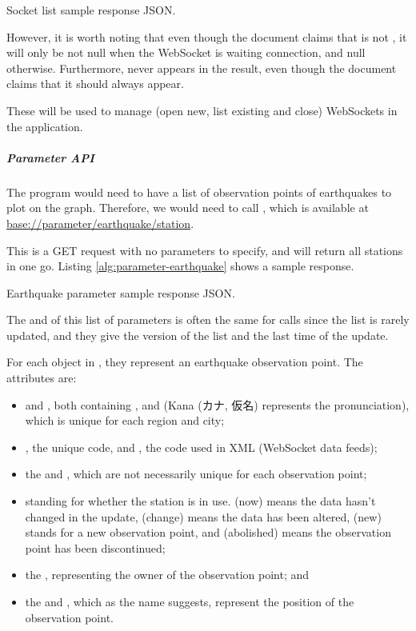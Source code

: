 \begin{listing}[!ht]
    \caption{Socket list sample response JSON.}
    \label{alg:socket-list}
\end{listing}

However, it is worth noting that even though the document claims that  is not , it will only be not null when the WebSocket is waiting connection, and null otherwise. Furthermore,  never appears in the result, even though the document claims that it should always appear.

These will be used to manage (open new, list existing and close) WebSockets in the application.

\subparagraph{Parameter API}

The program would need to have a list of observation points of earthquakes to plot on the graph. Therefore, we would need to call , which is available at \url{base://parameter/earthquake/station}.

This is a GET request with no parameters to specify, and will return all stations in one go. Listing \ref{alg:parameter-earthquake} shows a sample response.

\begin{listing}[!ht]
    \caption{Earthquake parameter sample response JSON.}
    \label{alg:parameter-earthquake}
\end{listing}

The  and  of this list of parameters is often the same for calls since the list is rarely updated, and they give the version of the list and the last time of the update.

For each object in , they represent an earthquake observation point. The attributes are:
\begin{itemize}
    \item {} and , both containing ,  and  (Kana (カナ, 仮名) represents the pronunciation), which is unique for each region and city;
    \item {}, the unique code, and , the code used in XML (WebSocket data feeds);
    \item the  and , which are not necessarily unique for each observation point;
    \item {} standing for whether the station is in use.  (now) means the data hasn't changed in the update,  (change) means the data has been altered,  (new) stands for a new observation point, and  (abolished) means the observation point has been discontinued;
    \item the , representing the owner of the observation point; and
    \item the  and , which as the name suggests, represent the position of the observation point.
\end{itemize}

